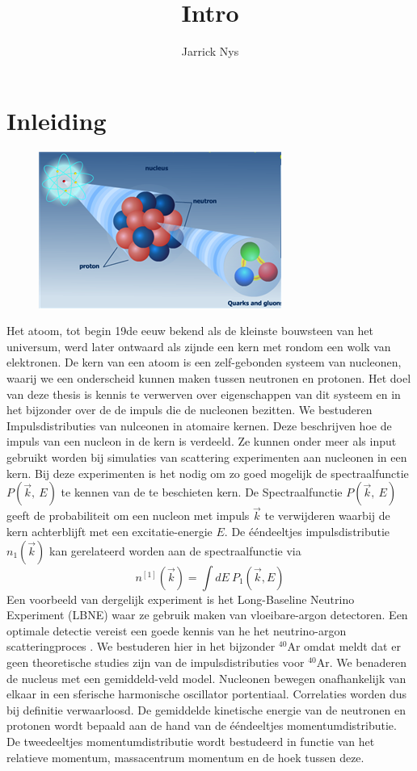 \documentclass[12pt]{article}
\title{Intro}
\author{Jarrick Nys}
\begin{document}
\maketitle
\section{Inleiding}

\begin{figure}[h!]
\centering
\includegraphics[scale=1]{Atom-Nucleus-Quark}
\end{figure}
Het atoom,  tot begin 19de eeuw bekend als de kleinste bouwsteen van het universum, werd later ontwaard als zijnde een kern met rondom een wolk van elektronen. De kern van een atoom is een zelf-gebonden systeem van nucleonen, waarij we een onderscheid kunnen maken tussen neutronen en protonen.  Het doel van deze thesis is kennis te verwerven over eigenschappen van dit systeem en in het bijzonder over de de impuls die de nucleonen bezitten. We bestuderen Impulsdistributies van nulceonen in atomaire kernen. Deze beschrijven hoe de impuls van een nucleon in de kern is verdeeld. Ze kunnen onder meer als input gebruikt worden bij simulaties van scattering experimenten aan nucleonen in een kern. Bij deze experimenten is het nodig om zo goed mogelijk de spectraalfunctie $P(\vec{k},\ E)$ te kennen van de te beschieten kern. De Spectraalfunctie $P(\vec{k},\ E)$ geeft de probabiliteit om een nucleon met impuls $\vec{k}$ te verwijderen waarbij de kern achterblijft met een excitatie-energie $E$. De \'{e}\'{e}ndeeltjes impulsdistributie $n_1(\vec{k})$ kan gerelateerd worden aan de spectraalfunctie via
\begin{equation}
n^{[1]}(\vec{k}) = \int dE \  P_1(\vec{k},E)
\end{equation} 
Een voorbeeld van dergelijk experiment is het Long-Baseline Neutrino Experiment (LBNE) waar ze gebruik maken van vloeibare-argon detectoren. Een optimale detectie vereist een goede kennis van he het neutrino-argon scatteringproces \cite{anderson2012first}. We bestuderen hier in het bijzonder $^{40}$Ar omdat \cite{ankowski2014} meldt dat er geen theoretische studies zijn van de impulsdistributies voor $^{40}$Ar.
We benaderen de nucleus met een gemiddeld-veld model. Nucleonen bewegen onafhankelijk van elkaar in een sferische harmonische oscillator portentiaal. Correlaties worden dus bij definitie verwaarloosd. De gemiddelde kinetische energie van de neutronen en protonen wordt bepaald aan de hand van de \'{e}\'{e}ndeeltjes momentumdistributie. De tweedeeltjes momentumdistributie wordt bestudeerd in functie van het relatieve momentum, massacentrum momentum en de hoek tussen deze.




\end{document}
